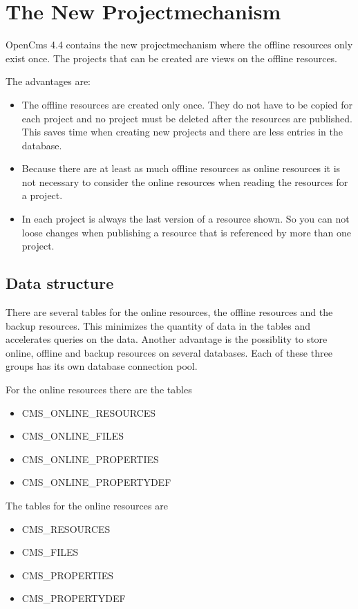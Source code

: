 \chapter{The New Projectmechanism}

OpenCms 4.4 contains the new projectmechanism where the offline
resources only exist once. The projects that can be created are
views on the offline resources.

The advantages are:
\begin{itemize}
\item The offline resources are created only once. They do not have to be copied for each project and no project must be deleted after the resources are published. This saves time when creating new projects and there are less entries in the database.
\item Because there are at least as much offline resources as online resources it is not necessary to consider the online resources when reading the resources for a project.
\item In each project is always the last version of a resource shown. So you can not loose changes when publishing a resource that is referenced by more than one project.
\end{itemize}

\section{Data structure}
 
 

There are several tables for the online resources, the offline
resources and the backup resources. This minimizes the quantity of
data in the tables and accelerates queries on the data. Another
advantage is the possiblity to store online, offline and backup
resources on several databases. Each of these three groups has its
own database connection pool.

For the online resources there are the tables
\begin{itemize}
\item CMS\_ONLINE\_RESOURCES
\item CMS\_ONLINE\_FILES
\item CMS\_ONLINE\_PROPERTIES
\item CMS\_ONLINE\_PROPERTYDEF
\end{itemize}

The tables for the online resources are
\begin{itemize}
\item CMS\_RESOURCES
\item CMS\_FILES
\item CMS\_PROPERTIES
\item CMS\_PROPERTYDEF
\end{itemize}

